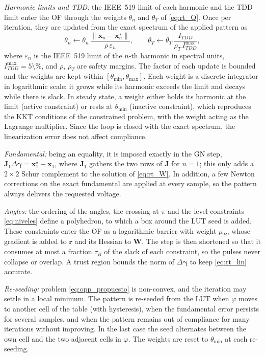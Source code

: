 \documentclass[conference]{IEEEtran}
\newcommand{\gv}{\boldsymbol{\gamma}}
\newcommand{\pct}{\text{\char`\%}}
\begin{document}
\textit{Harmonic limits and TDD:} the IEEE~519 limit of each harmonic and
the TDD limit enter the OF through the weights $\theta_n$ and $\theta_T$
of \eqref{eq:rt_Q}. Once per iteration, they are updated from the exact
spectrum of the applied pattern as
%
\begin{equation}
  \theta_n \leftarrow \theta_n\,
    \frac{\|\mathbf{x}_n-\mathbf{x}_n^\star\|}{\rho\,\varepsilon_n},
  \qquad
  \theta_T \leftarrow \theta_T\,
    \frac{I_{TDD}}{\rho_T\,I_{TDD}^{\max}},
  \label{eq:rt_theta}
\end{equation}
%
where $\varepsilon_n$ is the IEEE~519 limit of the $n$-th harmonic in
spectral units, $I_{TDD}^{\max}=5\pct$, and $\rho$, $\rho_T$ are safety
margins. The factor of each update is bounded and the weights are kept
within $[\theta_{\min},\theta_{\max}]$. Each weight is a discrete
integrator in logarithmic scale: it grows while its harmonic exceeds the
limit and decays while there is slack. In steady state, a weight either
holds its harmonic at the limit (active constraint) or rests at
$\theta_{\min}$ (inactive constraint), which reproduces the KKT conditions
of the constrained problem, with the weight acting as the Lagrange
multiplier. Since the loop is closed with the exact spectrum, the
linearization error does not affect compliance.

\textit{Fundamental:} being an equality, it is imposed exactly in the GN
step, $\mathbf{J}_1\Delta\gv = \mathbf{x}_1^\star-\mathbf{x}_1$, where
$\mathbf{J}_1$ gathers the two rows of $\mathbf{J}$ for $n=1$; this only
adds a $2\times2$ Schur complement to the solution of \eqref{eq:rt_W}. In
addition, a few Newton corrections on the exact fundamental are applied
at every sample, so the pattern always delivers the requested voltage.

\textit{Angles:} the ordering of the angles, the crossing at $\pi$ and the
level constraints \eqref{eq:niveles} define a polyhedron, to which a box
around the LUT seed is added. These constraints enter the OF as a
logarithmic barrier with weight $\mu_B$, whose gradient is added to
$\mathbf{r}$ and its Hessian to $\mathbf{W}$. The step is then shortened so
that it consumes at most a fraction $\tau_B$ of the slack of each
constraint, so the pulses never collapse or overlap. A trust region
bounds the norm of $\Delta\gv$ to keep \eqref{eq:rt_lin} accurate.

\textit{Re-seeding:} problem \eqref{eq:opp_propuesto} is non-convex, and
the iteration may settle in a local minimum. The pattern is re-seeded from
the LUT when $\varphi$ moves to another cell of the table (with
hysteresis), when the fundamental error persists for several samples, and
when the pattern remains out of compliance for many iterations without
improving. In the last case the seed alternates between the own cell and
the two adjacent cells in $\varphi$. The weights are reset to
$\theta_{\min}$ at each re-seeding.
\end{document}
